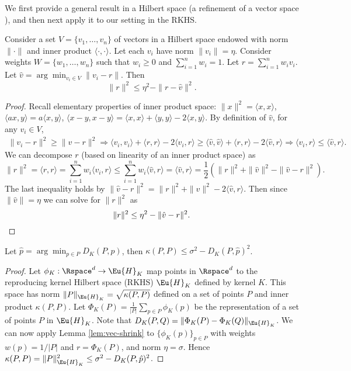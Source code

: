 \documentclass[11pt]{myclass}
\begin{document}
We first provide a general result in a Hilbert space (a refinement of a vector space \cite{Daume2004}), and then next apply it to our setting in the RKHS.  




\begin{lemma}
\label{lem:vec-shrink}
Consider a set $V = \{v_1, \ldots, v_n\}$ of vectors in a Hilbert space endowed with norm $\|\cdot\|$ and inner product $\langle \cdot, \cdot \rangle$.  Let each $v_i$ have norm $\|v_i\| = \eta$.  
Consider weights $W = \{w_1, \ldots, w_n\}$ such that $w_i \geq 0$ and $\sum_{i=1}^n w_i = 1$.  Let $r = \sum_{i=1}^n w_i v_i$.  Let $\hat v = \arg \min_{v_i \in V} \|v_i - r\|$.
Then
 \[
 \|r\|^2 \leq \eta^2 - \|r - \hat v\|^2.
 \]
\end{lemma}
\begin{proof}
Recall elementary properties of inner product space: 
$\| x\| ^2 = \langle x, x\rangle$, 
$\langle ax, y\rangle = a \langle x, y \rangle$, 
$\langle x - y, x - y \rangle = \langle x, x \rangle + \langle y, y \rangle - 2 \langle x, y \rangle$. 
By definition of $\hat v$, 
for any $v_i \in V$, 
\begin{align*}
 \| v_i - r \|^2 \geq \| \hat v - r \|^2  
 \Rightarrow \langle v_i, v_i \rangle + \langle r, r \rangle - 2 \langle v_i, r \rangle 
\geq \langle \hat v, \hat v \rangle + \langle r, r \rangle - 2 \langle \hat v, r \rangle 
 \Rightarrow \langle v_i, r \rangle \leq \langle \hat v, r \rangle. 
\end{align*}
We can decompose $r$ (based on linearity of an inner product space) as 
\[
\|r\|^2 
= 
\langle r, r\rangle 
= 
\sum_{i=1}^n w_i \langle v_i, r \rangle
\leq
\sum_{i=1}^n w_i \langle \hat v, r \rangle
= 
\langle \hat v, r \rangle
= 
\frac{1}{2} ( \|r\|^2 + \|\hat v\|^2 - \|\hat v - r\|^2).
\]
The last inequality holds by $\|\hat v - r\|^2 = \|r\|^2 + \|\hat v\|^2 - 2 \langle \hat v, r\rangle$.  
Then since $\|\hat v\| = \eta$ we can solve for $\|r\|^2$ as 
\[
\|r\|^2 \leq \eta^2 - \|\hat v - r\|^2. \qedhere
\]
\end{proof}


\begin{lemma}
\label{lem:HK-shrink}
Let $\hat p = \arg \min_{p \in P} D_K(P, p)$, then
$\kappa(P,P) \leq \sigma^2 - D_K(P,\hat p)^2$.
\end{lemma}
\begin{proof}
Let $\phi_K : \Rspace^d \to \Eu{H}_K$ map points in $\Rspace^d$ to the reproducing kernel Hilbert space (RKHS) $\Eu{H}_K$ defined by kernel $K$.  This space has norm $\|P\|_{\Eu{H}_K} = \sqrt{\kappa(P,P)}$ defined on a set of points $P$ and inner product $\kappa(P,P)$.  Let $\Phi_K(P) = \frac{1}{|P|}\sum_{p \in P} \phi_K(p)$ be the representation of a set of points $P$ in $\Eu{H}_K$.  
Note that $D_K(P,Q) = \|\Phi_K(P) - \Phi_K(Q)\|_{\Eu{H}_K}$.  
We can now apply Lemma \ref{lem:vec-shrink} to $\{\phi_K(p)\}_{p \in P}$ with weights $w(p) = 1/|P|$ and $r = \Phi_K(P)$, and norm $\eta = \sigma$.  Hence
$\kappa(P,P) = \|P\|_{\Eu{H}_K}^2 \leq \sigma^2 - D_K(P,\hat p)^2$.
\end{proof}
\end{document}
